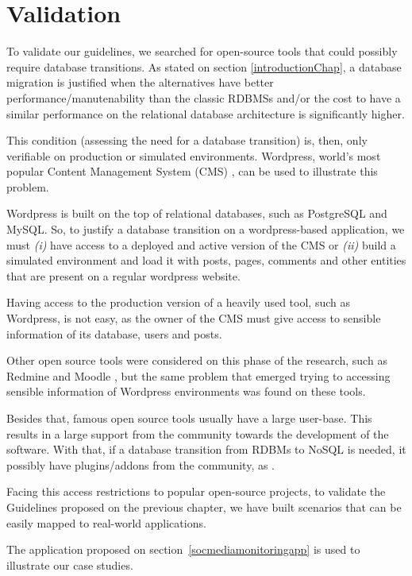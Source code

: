 \chapter{Validation}\label{validationChap}

To validate our guidelines, we searched for open-source tools that could possibly require database transitions. As stated on section \ref{introductionChap}, a database migration is justified when the alternatives have better performance/manutenability than the classic RDBMSs and/or the cost to have a similar performance on the relational database architecture is significantly higher.

This condition (assessing the need for a database transition) is, then, only verifiable on production or simulated environments. Wordpress\cite{wordpress}, world's most popular Content Management System (CMS)  \cite{cmsranking}, can be used to illustrate this problem.  

Wordpress is built on the top of relational databases, such as PostgreSQL and MySQL. So, to justify a database transition on a wordpress-based application, we must \textit{(i)} have access to a deployed and active version of the CMS or \textit{(ii)} build a simulated environment and load it with posts, pages, comments and other entities that are present on a regular wordpress website.

Having access to the production version of a heavily used tool, such as Wordpress, is not easy, as the owner of the CMS must give access to sensible information of its database, users and posts. 

Other open source tools were considered on this phase of the research, such as Redmine \cite{redmine} and Moodle \cite{moodle}, but the same problem that emerged trying to accessing sensible information of Wordpress environments was found on these tools.

Besides that, famous open source tools usually have a large user-base. This results in a large support from the community towards the development of the software. With that, if a database transition from RDBMs to NoSQL is needed, it possibly have plugins/addons from the community, as \cite{fantasticElasticsearch}.

Facing this access restrictions to popular open-source projects, to validate the Guidelines proposed on the previous chapter, we have built scenarios that can be easily mapped to real-world applications.

The application proposed on section~\ref{socmediamonitoringapp} is used to illustrate our case studies.

